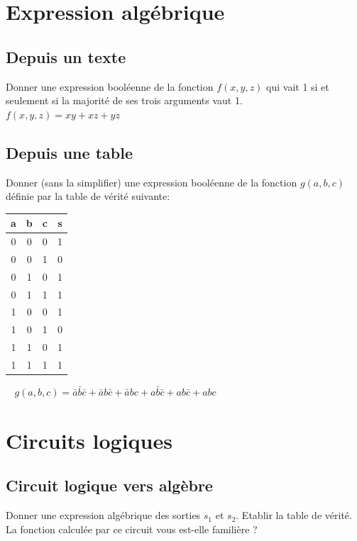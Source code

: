 \documentclass[10pt,a4paper]{article}
\begin{document}
\section{Expression algébrique}
\subsection{Depuis un texte}
Donner une expression booléenne de la fonction $f(x,y,z)$ qui vait 1 si et seulement si la majorité de ses trois arguments vaut 1.\\
$f(x,y,z) = xy+xz+yz$

\subsection{Depuis une table}
Donner (sans la simplifier) une expression booléenne de la fonction $g(a,b,c)$ définie par la table de vérité suivante:\\
\begin{tabular}{ccc|c}
a & b & c & s \\ 
\hline 
0 & 0 & 0 & 1 \\
0 & 0 & 1 & 0 \\
0 & 1 & 0 & 1 \\
0 & 1 & 1 & 1 \\
1 & 0 & 0 & 1 \\
1 & 0 & 1 & 0 \\
1 & 1 & 0 & 1 \\
1 & 1 & 1 & 1 \\ 
\end{tabular} 
$\ \ \ \ g(a,b,c) = \bar{a}\bar{b}\bar{c} + \bar{a}b\bar{c} + \bar{a}bc + a\bar{b}\bar{c} + ab\bar{c} + abc$

\section{Circuits logiques}
\subsection{Circuit logique vers algèbre}
Donner une expression algébrique des sorties $s_{1}$ et $s_{2}$. Etablir la table de vérité. La fonction calculée par ce circuit vous est-elle familière ?\\
\end{document}
